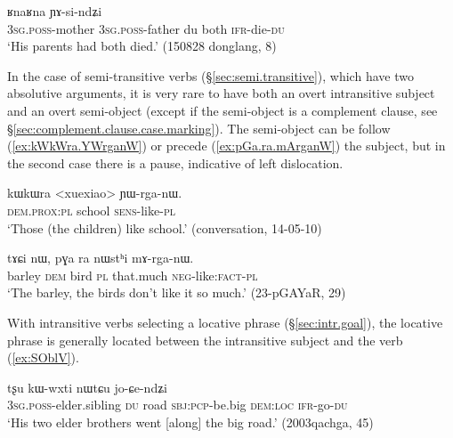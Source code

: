 \begin{exe}
	\ex \label{ex:RnaRna.YAsindZi}
	\gll [ɯ-mu ɯ-wa ni] ʁnaʁna ɲɤ-si-ndʑi \\
	\textsc{3sg}.\textsc{poss}-mother 	\textsc{3sg}.\textsc{poss}-father du both \textsc{ifr}-die-\textsc{du} \\ 
	\glt `His parents had both died.' (150828 donglang, 8)
\end{exe}

In the case of semi-transitive verbs (§\ref{sec:semi.transitive}), which have two absolutive arguments, it is very rare to have both an overt intransitive subject and an overt semi-object (except if the semi-object is a complement clause, see §\ref{sec:complement.clause.case.marking}). The semi-object can be follow (\ref{ex:kWkWra.YWrganW}) or precede (\ref{ex:pGa.ra.mArganW}) the subject, but in the second case there is a pause, indicative of left dislocation.

\begin{exe}
\ex \label{ex:kWkWra.YWrganW}
\gll kɯkɯra <xuexiao> ɲɯ-rga-nɯ. \\
\textsc{dem}.\textsc{prox}:\textsc{pl} school \textsc{sens}-like-\textsc{pl} \\
\glt `Those (the children) like school.' (conversation, 14-05-10)
\end{exe}

\begin{exe}
\ex \label{ex:pGa.ra.mArganW}
\gll  tɤɕi nɯ, pɣa ra nɯstʰi mɤ-rga-nɯ. \\
barley \textsc{dem} bird \textsc{pl} that.much \textsc{neg}-like:\textsc{fact}-\textsc{pl} \\
\glt `The barley, the birds don't like it so much.' (23-pGAYaR, 29)
\end{exe}

 With intransitive verbs selecting a locative phrase (§\ref{sec:intr.goal}), the locative phrase is generally located between the intransitive subject and the verb (\ref{ex:SOblV}). 

\begin{exe}
\ex \label{ex:SOblV}
\gll [ɯ-pi ni] tʂu kɯ-wxti nɯtɕu jo-ɕe-ndʑi \\
\textsc{3sg}.\textsc{poss}-elder.sibling \textsc{du} road \textsc{sbj}:\textsc{pcp}-be.big \textsc{dem}:\textsc{loc} \textsc{ifr}-go-\textsc{du} \\
\glt `His two elder brothers went [along] the big road.' (2003qachga, 45)
\end{exe}

